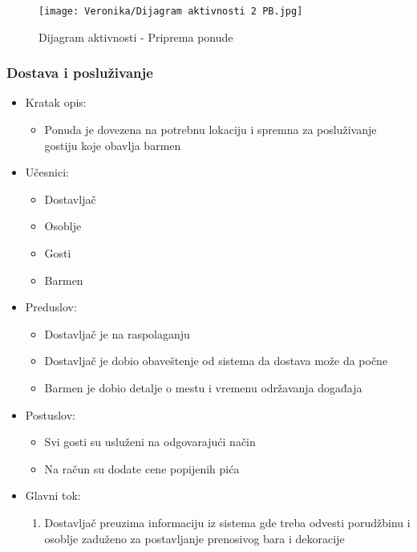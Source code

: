 \documentclass[a4paper]{article}
\begin{document}
\begin{figure}[H]
    \centering
    \texttt{[image: Veronika/Dijagram aktivnosti 2 PB.jpg]}
    \caption{Dijagram aktivnosti - Priprema ponude}
    \label{fig:PrenosiviBar}
\end{figure}


\subsubsection{Dostava i posluživanje}

\begin{itemize}
    \item Kratak opis:
        \begin{itemize}
            \item Ponuda je dovezena na potrebnu lokaciju i spremna za posluživanje gostiju koje obavlja barmen
        \end{itemize}
    \item Učesnici:
        \begin{itemize}
            \item Dostavljač
            \item Osoblje
            \item Gosti
            \item Barmen 
        \end{itemize}
    \item Preduslov:
        \begin{itemize}
		    \item Dostavljač je na raspolaganju
		     \item Dostavljač je dobio obaveštenje od sistema da dostava može da počne
		    \item Barmen je dobio detalje o mestu i vremenu održavanja događaja
        \end{itemize}
    \item Postuslov:
        \begin{itemize}
            \item Svi gosti su usluženi na odgovarajući način
            \item Na račun su dodate cene popijenih pića
        \end{itemize}
    \item Glavni tok:
        \begin{enumerate}
            \item Dostavljač preuzima informaciju iz sistema gde treba odvesti porudžbinu i osoblje zaduženo za postavljanje prenosivog bara i dekoracije

\end{enumerate}
\end{itemize}
\end{document}
